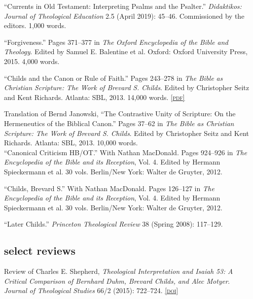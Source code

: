\documentclass[11pt]{article}
\newcommand{\pdf}[1]{\href{#1}{\footnotesize\textsc{[pdf]}}}
\newcommand{\doi}[1]{\href{https://doi.org/#1}{\footnotesize\textsc{[doi]}}}
\newcommand{\years}[1]{\marginnote{\footnotesize #1}}
\begin{document}
\years{2019}
``Currents in Old Testament: Interpreting Psalms and the Psalter.''
\emph{Didaktikos: Journal of Theological Education} 2.5 (April 2019):
45–46. Commissioned by the editors. 1,000 words.

\years{2015}
``Forgiveness.'' Pages 371--377 in \emph{The Oxford Encyclopedia of the
Bible and Theology}. Edited by Samuel E. Balentine et al. Oxford: Oxford
University Press, 2015. 4,000 words.

\years{2013}
``Childs and the Canon or Rule of Faith.'' Pages 243--278 in \emph{The
Bible as Christian Scripture: The Work of Brevard S. Childs}. Edited by
Christopher Seitz and Kent Richards. Atlanta: SBL, 2013. 14,000 words.
\pdf{http://danieldriver.com/assets/pdf/publications/Driver_2013.pdf}

\years{2013}
Translation of Bernd Janowski, ``The Contrastive Unity of Scripture: On
the Hermeneutics of the Biblical Canon.'' Pages 37--62 in \emph{The
Bible as Christian Scripture: The Work of Brevard S. Childs}. Edited by
Christopher Seitz and Kent Richards. Atlanta: SBL, 2013. 10,000 words.
\\%

\years{2012}
``Canonical Criticism HB/OT.'' With Nathan MacDonald. Pages 924–926 in
\emph{The Encyclopedia of the Bible and its Reception}, Vol. 4. Edited
by Hermann Spieckermann et al. 30 vols. Berlin/New York: Walter de
Gruyter, 2012.

\years{2012}
``Childs, Brevard S.'' With Nathan MacDonald. Pages 126–127 in \emph{The
Encyclopedia of the Bible and its Reception}, Vol. 4. Edited by Hermann
Spieckermann et al. 30 vols. Berlin/New York: Walter de Gruyter, 2012.

\years{2008}
``Later Childs.'' \emph{Princeton Theological Review} 38 (Spring 2008):
117--129.


\subsection*{select reviews}

\years{2015}
Review of Charles E. Shepherd, \emph{Theological Interpretation and
Isaiah 53: A Critical Comparison of Bernhard Duhm, Brevard Childs, and
Alec Motyer}. \emph{Journal of Theological Studies} 66/2 (2015):
722--724.
\doi{10.1093/jts/flv103}
\end{document}
